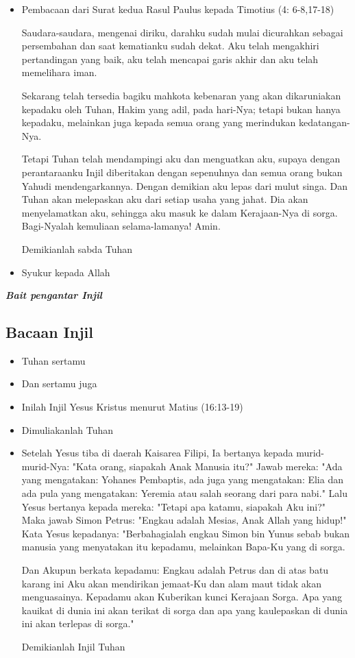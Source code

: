 \documentclass[a5paper,headsepline,titlepage,11pt,nnormalheadings]{scrbook}
\makeatletter
\newcommand{\BU}[1]{\begin{itemize} \item[U:] #1 \end{itemize}}
\newcommand{\BI}[1]{\begin{itemize} \item[I:] #1 \end{itemize}}
\newcommand{\BP}[1]{\begin{itemize} \item[P:] #1 \end{itemize}}
\newcommand{\lagu}[1]{%
  {\parindent \z@ \normalfont
    \interlinepenalty\@M \bfseries \emph{#1}\par\nobreak \vskip 20\p@ }}
\makeatother
\begin{document}
\BP{Pembacaan dari Surat kedua Rasul Paulus kepada Timotius (4: 6-8,17-18) 

Saudara-saudara, mengenai diriku, darahku sudah mulai dicurahkan sebagai persembahan dan saat kematianku sudah dekat. Aku telah mengakhiri pertandingan yang baik, aku telah mencapai garis akhir dan aku telah memelihara iman.

Sekarang telah tersedia bagiku mahkota kebenaran yang akan dikaruniakan kepadaku oleh Tuhan, Hakim yang adil, pada hari-Nya; tetapi bukan hanya kepadaku, melainkan juga kepada semua orang yang merindukan kedatangan-Nya.

Tetapi Tuhan telah mendampingi aku dan menguatkan aku, supaya dengan perantaraanku Injil diberitakan dengan sepenuhnya dan semua orang bukan Yahudi mendengarkannya. Dengan demikian aku lepas dari mulut singa.
Dan Tuhan akan melepaskan aku dari setiap usaha yang jahat. Dia akan menyelamatkan aku, sehingga aku masuk ke dalam Kerajaan-Nya di sorga. Bagi-Nyalah kemuliaan selama-lamanya! Amin.

Demikianlah sabda Tuhan }

\BU{Syukur kepada Allah} 

\lagu{Bait pengantar Injil}

\subsection*{Bacaan Injil} 

\BI{Tuhan sertamu} 
\BU{Dan sertamu juga} 
\BI{Inilah Injil Yesus Kristus menurut Matius (16:13-19)} 
\BU{Dimuliakanlah Tuhan}

\BI{Setelah Yesus tiba di daerah Kaisarea Filipi, Ia bertanya kepada murid-murid-Nya: "Kata orang, siapakah Anak Manusia itu?"
Jawab mereka: "Ada yang mengatakan: Yohanes Pembaptis, ada juga yang mengatakan: Elia dan ada pula yang mengatakan: Yeremia atau salah seorang dari para nabi."
Lalu Yesus bertanya kepada mereka: "Tetapi apa katamu, siapakah Aku ini?"
Maka jawab Simon Petrus: "Engkau adalah Mesias, Anak Allah yang hidup!"
Kata Yesus kepadanya: "Berbahagialah engkau Simon bin Yunus sebab bukan manusia yang menyatakan itu kepadamu, melainkan Bapa-Ku yang di sorga.

Dan Akupun berkata kepadamu: Engkau adalah Petrus dan di atas batu karang ini Aku akan mendirikan jemaat-Ku dan alam maut tidak akan menguasainya.
Kepadamu akan Kuberikan kunci Kerajaan Sorga. Apa yang kauikat di dunia ini akan terikat di sorga dan apa yang kaulepaskan di dunia ini akan terlepas di sorga."

Demikianlah Injil Tuhan} 
\end{document}

